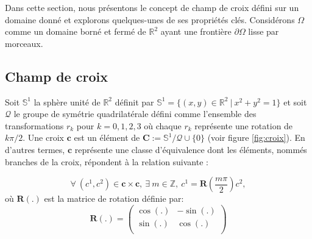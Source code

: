 Dans cette section, nous présentons le concept de champ de croix défini sur un domaine donné et explorons quelques-unes de ses propriétés clés. Considérons $\Omega$ comme un domaine borné et fermé de $\mathbb{R}^2$ ayant une frontière $\partial\Omega$ lisse par morceaux.

\subsection{Champ de croix}

Soit $\mathbb{S}^1$ la sphère unité de $\mathbb{R}^2$ définit par $\mathbb{S}^1=\{(x,y)\in\mathbb{R}^2~|~x^2+y^2=1\}$ et soit $\mathcal{Q}$ le groupe de symétrie quadrilatérale défini comme l'ensemble des transformations $r_k$ pour $k = 0, 1, 2, 3$  où chaque $r_k$ représente une rotation de $k\pi/2$. Une croix $\mathbf{c}$ est un élément de $\mathbf{C}:=\mathbb{S}^1/\mathcal{Q}\cup\{0\}$ \cite{beaufort2017computing} (voir figure \ref{fig:croix}). En d'autres termes, $\mathbf{c}$ représente une classe d'équivalence dont les éléments, nommés branches de la croix, répondent à la relation suivante :

\begin{equation}
\label{eq:croix}
\forall~(c^1, c^2)\in\mathbf{c}\times\mathbf{c},~\exists~m\in\mathbb{Z},~c^1=\mathbf{R}\left(\frac{m\pi}{2}\right)c^2,
\end{equation}
où $\mathbf{R}(.)$ est la matrice de rotation définie par:
\begin{equation}
\label{eq:matricerotation}
\mathbf{R}(.)=
\begin{pmatrix}
\cos(.) & -\sin(.) \\
\sin(.) & \cos(.) \\
\end{pmatrix}
\end{equation}

